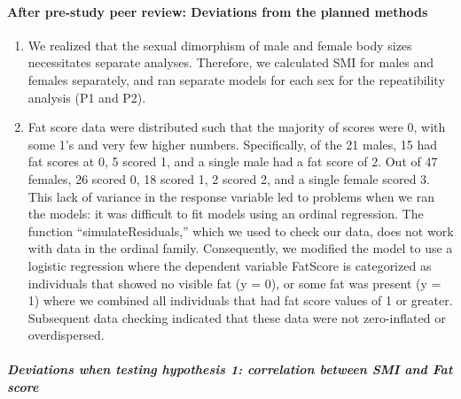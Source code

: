 \documentclass[
]{article}
\begin{document}
\hypertarget{after-pre-study-peer-review-deviations-from-the-planned-methods}{%
\paragraph{\texorpdfstring{\textbf{After pre-study peer review:
Deviations from the planned
methods}}{After pre-study peer review: Deviations from the planned methods}}\label{after-pre-study-peer-review-deviations-from-the-planned-methods}}

\begin{enumerate}
\def\labelenumi{\arabic{enumi})}
\item
  We realized that the sexual dimorphism of male and female body sizes
  necessitates separate analyses. Therefore, we calculated SMI for males
  and females separately, and ran separate models for each sex for the
  repeatibility analysis (P1 and P2).
\item
  Fat score data were distributed such that the majority of scores were
  0, with some 1's and very few higher numbers. Specifically, of the 21
  males, 15 had fat scores at 0, 5 scored 1, and a single male had a fat
  score of 2. Out of 47 females, 26 scored 0, 18 scored 1, 2 scored 2,
  and a single female scored 3. This lack of variance in the response
  variable led to problems when we ran the models: it was difficult to
  fit models using an ordinal regression. The function
  ``simulateResiduals,'' which we used to check our data, does not work
  with data in the ordinal family. Consequently, we modified the model
  to use a logistic regression where the dependent variable FatScore is
  categorized as individuals that showed no visible fat (y = 0), or some
  fat was present (y = 1) where we combined all individuals that had fat
  score values of 1 or greater. Subsequent data checking indicated that
  these data were not zero-inflated or overdispersed.
\end{enumerate}

\hypertarget{deviations-when-testing-hypothesis-1-correlation-between-smi-and-fat-score}{%
\subparagraph{Deviations when testing hypothesis 1: correlation between
SMI and Fat
score}\label{deviations-when-testing-hypothesis-1-correlation-between-smi-and-fat-score}}
\end{document}

